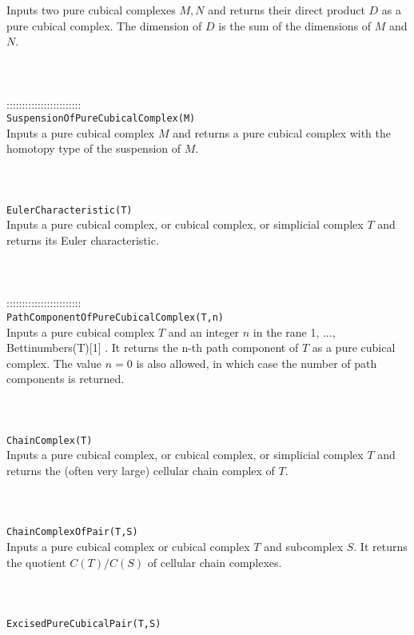 \documentclass[a4paper,11pt]{report}
\begin{document}
{ Inputs two pure cubical complexes $M,N$ and returns their direct product $D$ as a pure cubical complex. The dimension of $D$ is the sum of the dimensions of $M$ and $N$. \\
 \\
 \\
 \\
 ::::::::::::::::::::::::\\
 \texttt{SuspensionOfPureCubicalComplex(M)}\\
 

 Inputs a pure cubical complex $M$ and returns a pure cubical complex with the homotopy type of the suspension of $M$. \\
 \\
 \\
 \\
 \texttt{EulerCharacteristic(T)}\\
 

 Inputs a pure cubical complex, or cubical complex, or simplicial complex $T$ and returns its Euler characteristic. \\
 \\
 \\
 \\
 ::::::::::::::::::::::::\\
 \texttt{PathComponentOfPureCubicalComplex(T,n)}\\
 

 Inputs a pure cubical complex $T$ and an integer $n$ in the rane 1, ..., Bettinumbers(T)[1] . It returns the n-th path component of $T$ as a pure cubical complex. The value $n=0$ is also allowed, in which case the number of path components is returned. \\
 \\
 \\
 \\
 \texttt{ChainComplex(T)}\\
 

 Inputs a pure cubical complex, or cubical complex, or simplicial complex $T$ and returns the (often very large) cellular chain complex of $T$. \\
 \\
 \\
 \\
 \texttt{ChainComplexOfPair(T,S)}\\
 

 Inputs a pure cubical complex or cubical complex $T$ and subcomplex $S$. It returns the quotient $C(T)/C(S)$ of cellular chain complexes. \\
 \\
 \\
 \\
 \texttt{ExcisedPureCubicalPair(T,S)}\\
 

}
\end{document}
